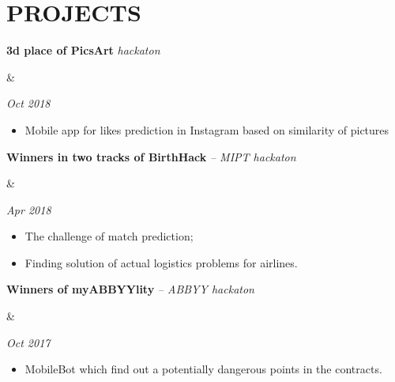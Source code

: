 \documentclass[11pt,a4paper,roman]{moderncv}
\newcommand*{\cvcourse}[3]{
    \parbox[t]{0.78\textwidth}{
    {\bfseries #2} \\ {\itshape #3}
    }&\parbox[t]{0.22\textwidth}{
    \hfill {\itshape #1}}
}
\newcommand*{\cvhack}[3]{
    \parbox[t]{0.78\textwidth}{
    {\bfseries #2} {\itshape #3}
    }&\parbox[t]{0.22\textwidth}{
    \hfill {\itshape #1}}
}
\begin{document}


\section{PROJECTS}

{\cvhack{Oct 2018}
        {3d place of PicsArt}
        {hackaton}
{\begin{itemize}
  \item Mobile app for likes prediction in Instagram based on similarity of pictures
\end{itemize}}}

{\cvhack{Apr 2018}
        {Winners in two tracks of BirthHack}
        {-- MIPT hackaton}
{\begin{itemize}
  \item The challenge of match prediction;
  \item Finding solution of actual logistics problems for airlines.
\end{itemize}}}

{\cvhack{Oct 2017}
        {Winners of myABBYYlity}
        {-- ABBYY hackaton}
{\begin{itemize}
  \item MobileBot which find out a potentially dangerous points in the contracts.
\end{itemize}}}



% 
% 
\end{document}
